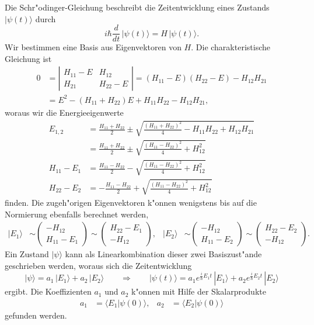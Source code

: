 Die Schr"odinger-Gleichung beschreibt die Zeitentwicklung eines
Zustands $|\psi(t)\rangle$ durch
\[
i\hbar\frac{d}{dt}\,|\psi(t)\rangle = H\, |\psi(t)\rangle.
\]
Wir bestimmen eine Basis aus Eigenvektoren von $H$.
Die charakteristische Gleichung ist
\begin{align*}
0&=
\left|\begin{matrix}
H_{11}-E&H_{12}\\
H_{21}&H_{22}-E
\end{matrix}\right|
=
(H_{11}-E)(H_{22}-E)-H_{12}H_{21}
\\
&=
E^2 - (H_{11}+H_{22})E + H_{11}H_{22}-H_{12}H_{21},
\end{align*}
woraus wir die Energieeigenwerte
\begin{align*}
E_{1,2}
&=
\frac{H_{11}+H_{22}}2\pm\sqrt{\frac{(H_{11}+H_{22})^2}4-H_{11}H_{22}+H_{12}H_{21}}
\\
&=
\frac{H_{11}+H_{22}}2\pm\sqrt{\frac{(H_{11}-H_{22})^2}4+H_{12}^2}
\\
H_{11}-E_1
&=
\frac{H_{11}-H_{22}}2-\sqrt{\frac{(H_{11}-H_{22})^2}4+H_{12}^2}
\\
H_{22}-E_2
&=
-\frac{H_{11}-H_{22}}2+\sqrt{\frac{(H_{11}-H_{22})^2}4+H_{12}^2}
\end{align*}
finden.
Die zugeh"origen Eigenvektoren k"onnen wenigstens bis auf die Normierung
ebenfalls berechnet werden,
\begin{align*}
|E_1\rangle
&\sim
\begin{pmatrix}
  -H_{12} \\
H_{11}-E_1
\end{pmatrix}
\sim
\begin{pmatrix}
H_{22}-E_1 \\
   -H_{12}
\end{pmatrix},
&
|E_2\rangle
&\sim
\begin{pmatrix}
   -H_{12} \\
H_{11}-E_2
\end{pmatrix}
\sim
\begin{pmatrix}
H_{22}-E_2 \\
   -H_{12}
\end{pmatrix}.
\end{align*} 
Ein Zustand $|\psi\rangle$ kann als Linearkombination dieser zwei
Basiszust"ande geschrieben werden, woraus sich die Zeitentwicklung
\[
|\psi\rangle
=
a_1\,|E_1\rangle
+
a_2\,|E_2\rangle
\qquad\Rightarrow\qquad
|\psi(t)\rangle
=
a_1e^{\frac{i}{\hbar}E_1t}\,|E_1\rangle
+
a_2e^{\frac{i}{\hbar}E_2t}\,|E_2\rangle
\]
ergibt.
Die Koeffizienten $a_1$ und $a_2$ k"onnen mit Hilfe der Skalarprodukte
\begin{align*}
a_1&=\langle E_1|\psi(0)\rangle,%
&
a_2&=\langle E_2|\psi(0)\rangle
\end{align*}
gefunden werden.

